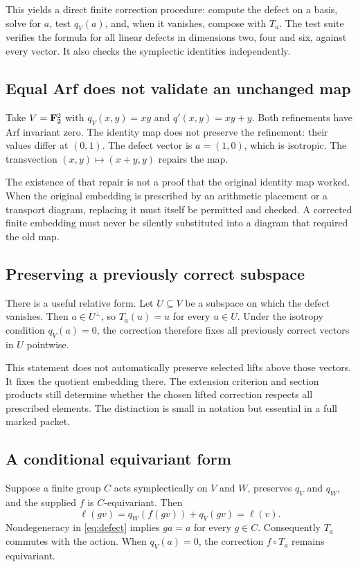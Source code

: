 This yields a direct finite correction procedure: compute the defect on a basis, solve for $a$, test $q_V(a)$, and, when it vanishes, compose with $T_a$. The test suite verifies the formula for all linear defects in dimensions two, four and six, against every vector. It also checks the symplectic identities independently.

\subsection{Equal Arf does not validate an unchanged map}
Take $V=\mathbf F_2^2$ with $q_V(x,y)=xy$ and $q'(x,y)=xy+y$. Both refinements have Arf invariant zero. The identity map does not preserve the refinement: their values differ at $(0,1)$. The defect vector is $a=(1,0)$, which is isotropic. The transvection $(x,y)\mapsto(x+y,y)$ repairs the map.

The existence of that repair is not a proof that the original identity map worked. When the original embedding is prescribed by an arithmetic placement or a transport diagram, replacing it must itself be permitted and checked. A corrected finite embedding must never be silently substituted into a diagram that required the old map.

\subsection{Preserving a previously correct subspace}
There is a useful relative form. Let $U\subseteq V$ be a subspace on which the defect vanishes. Then $a\in U^\perp$, so $T_a(u)=u$ for every $u\in U$. Under the isotropy condition $q_V(a)=0$, the correction therefore fixes all previously correct vectors in $U$ pointwise.

This statement does not automatically preserve selected lifts above those vectors. It fixes the quotient embedding there. The extension criterion and section products still determine whether the chosen lifted correction respects all prescribed elements. The distinction is small in notation but essential in a full marked packet.

\subsection{A conditional equivariant form}
Suppose a finite group $C$ acts symplectically on $V$ and $W$, preserves $q_V$ and $q_W$, and the supplied $f$ is $C$-equivariant. Then
\[
 \ell(gv)=q_W(f(gv))+q_V(gv)=\ell(v).
\]
Nondegeneracy in \eqref{eq:defect} implies $ga=a$ for every $g\in C$. Consequently $T_a$ commutes with the action. When $q_V(a)=0$, the correction $f\circ T_a$ remains equivariant.

